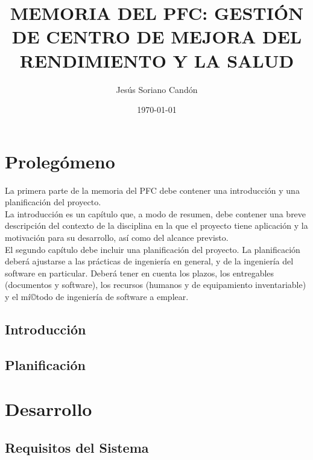 \documentclass[a4paper,11pt]{book}
\title{MEMORIA DEL PFC: GESTIÓN DE CENTRO DE MEJORA DEL RENDIMIENTO Y LA SALUD}
\author{Jesús Soriano Candón}
\date{\today}
\begin{document}
\pagestyle{empty}


\cleardoublepage


\cleardoublepage


\newpage


\newpage


\frontmatter

\tableofcontents
\listoffigures
\listoftables

\mainmatter

\part{Prolegómeno}
\null\vfill
\noindent La primera parte de la memoria del PFC debe contener una introducción y una planificación del proyecto.\\

La introducción es un capí­tulo que, a modo de resumen, debe contener una breve descripción del contexto de la disciplina en la que el proyecto tiene aplicación y la motivación para su desarrollo, así­ como del alcance previsto.\\

El segundo capí­tulo debe incluir una planificación del proyecto. La planificación deberá ajustarse a las prácticas de ingenierí­a en general, y de la ingenierí­a del software en particular. Deberá tener en cuenta los plazos, los entregables (documentos y software), los recursos (humanos y de equipamiento inventariable) y el mí©todo de ingenierí­a de software a emplear.
\\

\chapter{Introducción}


\chapter{Planificación}


\part{Desarrollo}
\null\vfill

\chapter{Requisitos del Sistema}

\end{document}
